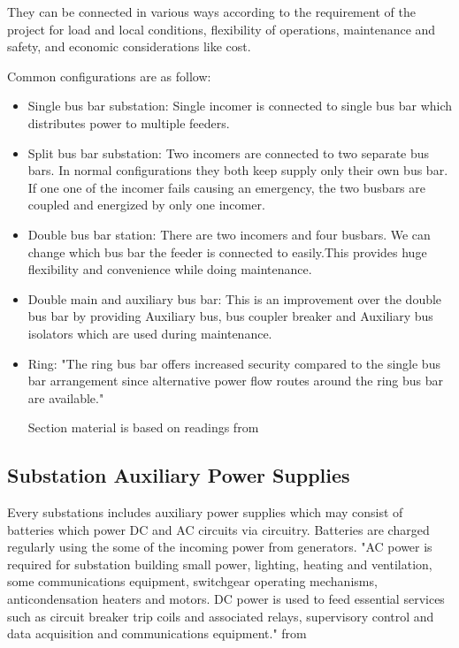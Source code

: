 \documentclass[11pt, a4paper]{article} %
\begin{document}
They can be connected in various ways according to the requirement of the project for load and local conditions, flexibility of operations, maintenance and safety, and economic considerations like cost.

Common configurations are as follow:
\begin{itemize}
    \item Single bus bar substation: Single incomer is connected to single bus bar which distributes power to multiple feeders.
    \item Split bus bar substation: Two incomers are connected to two separate bus bars. In normal configurations they both keep supply only their own bus bar. If one one of the incomer fails causing an emergency, the two busbars are coupled and energized by only one incomer.
    \item Double bus bar station: There are two incomers and four busbars. We can change which bus bar the feeder is connected to easily.This provides huge flexibility and convenience while doing maintenance.
    \item Double main and auxiliary bus bar: This is an improvement over the double bus bar by providing Auxiliary bus, bus coupler breaker and Auxiliary bus isolators which are used during maintenance.
    \item Ring: "The ring bus bar offers increased security compared to the single bus bar arrangement since alternative power flow routes around the ring bus bar are available." 
    
    Section material is based on readings from \citet{book1}
    
\end{itemize}

\subsection{Substation Auxiliary Power Supplies}

Every substations includes auxiliary power supplies which may consist of batteries which power DC and AC circuits via circuitry. Batteries are charged regularly using the some of the incoming power from generators. "AC power is required for substation building small power, lighting, heating and ventilation,
some communications equipment, switchgear operating mechanisms, anticondensation heaters and motors. 
DC power is used to feed essential services such as circuit breaker trip coils and associated relays, supervisory control and data acquisition and communications equipment."
from \citet{book1}
\end{document}
